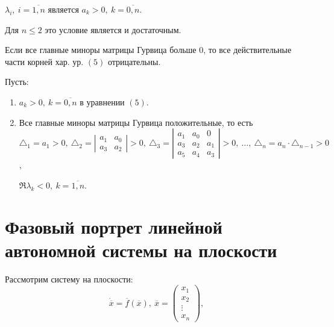 \begin{theorem}
	$\lambda _i, \ i = \overline{1,n} $ является $a_k > 0, \ k = \overline{0,n} $.

	Для $n \leqslant 2$ это условие является и достаточным.
\end{theorem}

\begin{theorem}
	Если все главные миноры матрицы Гурвица больше $0$, то все действительные части корней хар. ур. $(5)$ отрицательны.
\end{theorem}

\begin{crit}
	Пусть:
	\begin{enumerate}
		\item $a_k > 0, \ k = \overline{0,n} $ в уравнении $(5)$.
		\item Все главные миноры матрицы Гурвица положительные, то есть $\triangle_1 = a_1 > 0, \ \triangle_2 = \left|\begin{array}{cc}
				      a_1 & a_0 \\ a_3 & a_2
			      \end{array}\right| > 0, \ \triangle_3 = \left|\begin{array}{ccc}
				      a_1 & a_0 & 0   \\
				      a_3 & a_2 & a_1 \\
				      a_5 & a_4 & a_3
			      \end{array}\right| > 0, \ \ldots, \ \triangle_n = a_n \cdot \triangle_{n-1} > 0$,

		      $\Re \lambda _k < 0, \ k = \overline{1,n} $.
	\end{enumerate}
\end{crit}

\section{Фазовый портрет линейной автономной системы на плоскости}

Рассмотрим систему на плоскости:
\[
	\dot{\overline{x} } = \overline{f} (\overline{x} ), \ \overline{x} = \left(\begin{array}{c}
			x_1 \\ x_2 \\ \vdots \\ x_n
		\end{array}\right),
\]

